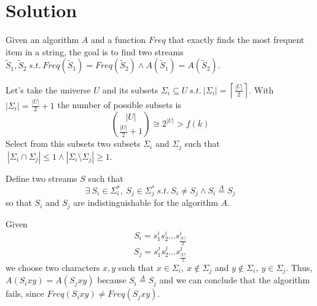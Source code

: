 \documentclass{article}
\begin{document}
\section{Solution}


Given an algorithm $A$ and a function $Freq$ that exactly finds the most frequent item in a string, the goal is to find two streams $\tilde S_1,\tilde S_2\ s.t.\ Freq(\tilde S_1)=Freq(\tilde S_2) \land A(\tilde S_1)=A(\tilde S_2)$.

Let's take the universe $U$ and its subsets $\Sigma_i\subseteq U\ s.t.\ |\Sigma_i|=\left\lceil \frac{|U|}{2} \right\rceil$. With $|\Sigma_i|=\frac{|U|}{2}+1$ the number of possible subsets is $$\binom{|U|}{\frac{|U|}{2}+1}\cong 2^{|U|}>f(k)$$
Select from this subsets two subsets $\Sigma_i$ and $\Sigma_j$ such that $\ |\Sigma_i \cap \Sigma_j| \leq 1 \land |\Sigma_i \setminus \Sigma_j| \geq 1$. 

Define two streams $S$ such that $$\exists\ S_i\in\Sigma_i^*,\ S_j\in\Sigma_j^*\ s.t.\ S_i\neq S_j \land S_i\overset{A}{=}S_j$$ so that $S_i$ and $S_j$ are indistinguishable for the algorithm $A$.

Given $$S_i=s_1^i s_2^i \ldots s_\frac{|U|}{2}^i$$ $$S_j=s_1^j s_2^j \ldots s_\frac{|U|}{2}^j$$ we choose two characters $x,y$ such that $x\in \Sigma_i,\ x\notin \Sigma_j$ and $y\notin \Sigma_i,\ y\in \Sigma_j$. 
Thus, $A(S_i xy)=A(S_j xy)$ because $S_i\overset{A}{=}S_j$ and we can conclude that the algorithm fails, since $Freq(S_i xy)\neq Freq(S_j xy)$.
\end{document}
